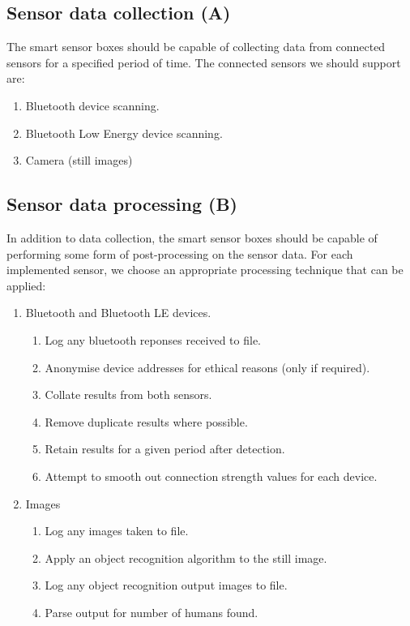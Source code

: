 \documentclass{l4proj}
\begin{document}
\subsection{Sensor data collection (A)}
The smart sensor boxes should be capable of collecting data from connected sensors for a specified period of time. The connected sensors we should support are:
\begin{enumerate}
  \item Bluetooth device scanning.
  \item Bluetooth Low Energy device scanning.
  \item Camera (still images)
\end{enumerate}

\subsection{Sensor data processing (B)}
In addition to data collection, the smart sensor boxes should be capable of performing some form of post-processing on the sensor data. For each implemented sensor, we choose an appropriate processing technique that can be applied:

\begin{enumerate}
  \item Bluetooth and Bluetooth LE devices.
  \begin{enumerate}
    \item Log any bluetooth reponses received to file.
    \item Anonymise device addresses for ethical reasons (only if required).
    \item Collate results from both sensors.
    \item Remove duplicate results where possible.
    \item Retain results for a given period after detection.
    \item Attempt to smooth out connection strength values for each device.
  \end{enumerate}
  \item Images
  \begin{enumerate}
    \item Log any images taken to file.
    \item Apply an object recognition algorithm to the still image.
    \item Log any object recognition output images to file.
    \item Parse output for number of humans found.
  \end{enumerate}
\end{enumerate}
\end{document}
